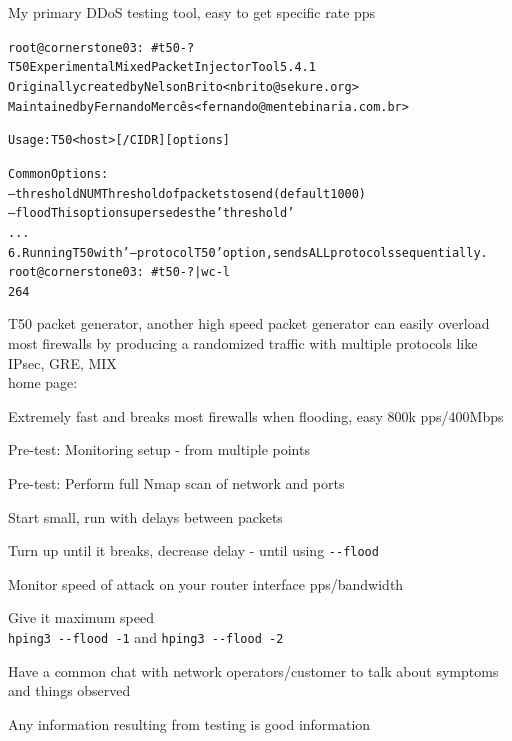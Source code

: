 \documentclass[Screen16to9,17pt]{foils}
\begin{document}
\centerline{My primary DDoS testing tool, easy to get specific rate pps}




\begin{alltt}\footnotesize
root@cornerstone03:~# t50 -?
T50 Experimental Mixed Packet Injector Tool 5.4.1
Originally created by Nelson Brito <nbrito@sekure.org>
Maintained by Fernando Mercês <fernando@mentebinaria.com.br>

Usage: T50 <host> [/CIDR] [options]

Common Options:
    --threshold NUM        Threshold of packets to send     (default 1000)
    --flood                This option supersedes the 'threshold'
...
6. Running T50 with '--protocol T50' option, sends ALL protocols sequentially.
root@cornerstone03:~# t50 -? | wc -l
264
\end{alltt}

\begin{list2}
\item T50 packet generator, another high speed packet generator
can easily overload most firewalls by producing a randomized traffic with multiple protocols like IPsec, GRE, MIX \\
home page: 
\end{list2}

\centerline{Extremely fast and breaks most firewalls when flooding, easy 800k pps/400Mbps}


\begin{list2}
\item Pre-test: Monitoring setup - from multiple points
\item Pre-test: Perform full Nmap scan of network and ports
\item Start small, run with delays between packets
\item Turn up until it breaks, decrease delay - until using \verb+--flood+
\item Monitor speed of attack on your router interface pps/bandwidth
\item Give it maximum speed\\
 \verb+hping3 --flood -1+ and \verb+hping3 --flood -2+
\item Have a common chat with network operators/customer to talk about symptoms and things observed
\item Any information resulting from testing is good information
\end{list2}
\end{document}
